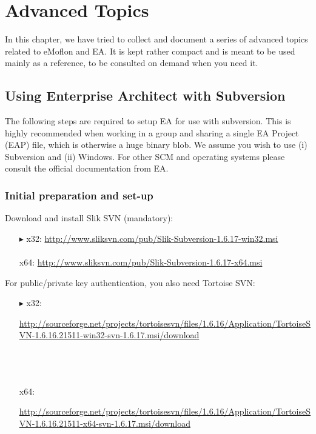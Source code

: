 \chapter{Advanced Topics}
\label{chap:advanced_topics}

In this chapter, we have tried to collect and document a series of advanced topics related to eMoflon and EA.
It is kept rather compact and is meant to be used mainly as a reference, to be consulted on demand when you need it.

\section{Using Enterprise Architect with Subversion}
The following steps are required to setup EA for use with subversion.
This is highly recommended when working in a group and sharing a single EA Project (EAP) file, which is otherwise a huge binary blob.
We assume you wish to use (i) Subversion and (ii) Windows.
For other SCM and operating systems please consult the official documentation from EA.

\subsection{Initial preparation and set-up}

Download and install Slik SVN (mandatory):
\begin{enumerate}
  \item[$\blacktriangleright$] x32: \small{\url{http://www.sliksvn.com/pub/Slik-Subversion-1.6.17-win32.msi}}\\\\
   x64: {\small \url{http://www.sliksvn.com/pub/Slik-Subversion-1.6.17-x64.msi}}
\end{enumerate}

For public/private key authentication, you also need Tortoise SVN:
 
\begin{enumerate}
  \item[$\blacktriangleright$] x32: {\small \begin{minipage}{.95\textwidth}  \url{http://sourceforge.net/projects/tortoisesvn/files/1.6.16/Application/TortoiseSVN-1.6.16.21511-win32-svn-1.6.17.msi/download}
    \end{minipage}}\\\\\\
  x64: {\small\begin{minipage}{.9\textwidth}  \url{http://sourceforge.net/projects/tortoisesvn/files/1.6.16/Application/TortoiseSVN-1.6.16.21511-x64-svn-1.6.17.msi/download}\end{minipage}}
\end{enumerate} 

